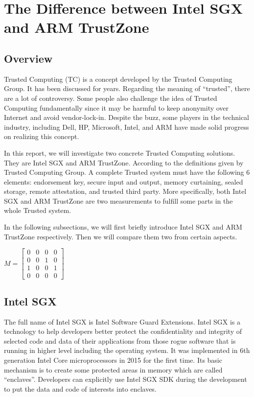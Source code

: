 \section{The Difference between Intel SGX and ARM TrustZone}\label{sec:difference}







\subsection{Overview}
Trusted Computing (TC) is a concept developed by the Trusted Computing Group.
It has been discussed for years. Regarding the meaning of ``trusted'', there
are a lot of controversy. Some people also challenge the idea of Trusted
Computing fundamentally since it may be harmful to keep anonymity over 
Internet and avoid vendor-lock-in. Despite the buzz, some players in 
the technical industry, including Dell, HP, Microsoft, Intel, and ARM 
have made solid progress on realizing this concept.

In this report, we will investigate two concrete Trusted Computing solutions.
They are Intel SGX and ARM TrustZone. 
According to the definitions given by Trusted Computing Group. A complete 
Trusted system must have the following 6 elements: endorsement key, 
secure input and output, memory curtaining, sealed storage, remote 
attestation, and trusted third party. More specifically, both Intel
SGX and ARM TrustZone are two measurements to fulfill some parts
in the whole Trusted system.  
 
In the following subsections, we will first briefly introduce 
Intel SGX and ARM TrustZone respectively. Then we will compare 
them two from certain aspects.

$M=\left [ \begin{array}{lcrr}
	0 & 0 & 0 & 0 \\ 
	0 & 0 & 1 & 0\\
	1 & 0 & 0 & 1\\
	0 & 0 & 0 & 0
\end{array}  \right ]$

\subsection{Intel SGX}
The full name of Intel SGX is Intel Software Guard Extensions. Intel
SGX is a technology to help developers better protect the 
confidentiality and integrity of selected code and data of their 
applications from those rogue software that is running in higher
level including the operating system. It was implemented in 6th
generation Intel Core microprocessors in 2015 for the first time.
Its basic mechanism is to create some protected areas in memory 
which are called ``enclaves''. Developers can explicitly use Intel
SGX SDK during the development to put the data and code of interests 
into enclaves.   


